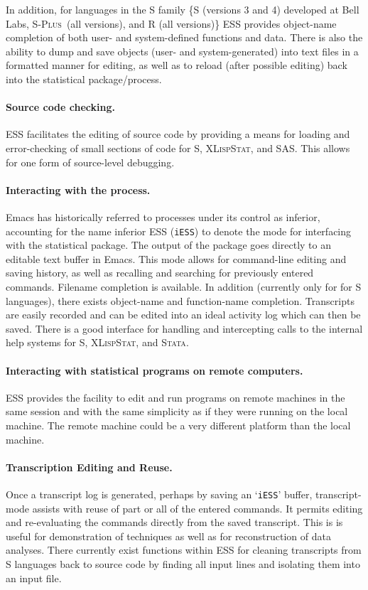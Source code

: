 \documentclass{article}
\newcommand*{\Splus}{\textsc{S-Plus}}
\newcommand*{\XLispStat}{\textsc{XLispStat}}
\newcommand*{\Stata}{\textsc{Stata}}
\newcommand{\stexttt}[1]{{\small\texttt{#1}}}
\newcommand{\file}[1]{`\stexttt{#1}'}
\begin{document}
In addition, for languages in the S family \{S (versions 3 and 4)
developed at Bell Labs, \Splus\ (all versions), and R (all versions)\}
ESS provides object-name completion of both user- and system-defined
functions and data.  There is also the ability to dump and save
objects (user- and system-generated) into text files in a formatted
manner for editing, as well as to reload (after possible editing) back
into the statistical package/process.

\paragraph{Source code checking.}
ESS facilitates the editing of source code by providing a means
for loading and error-checking of small sections of code for S,
\XLispStat, and SAS.  This allows for one form of source-level
debugging.

\paragraph{Interacting with the process.}
Emacs has historically referred to processes under its control as
inferior, accounting for the name inferior ESS (\stexttt{iESS}) to
denote the mode for interfacing with the statistical package.  The
output of the package goes directly to an editable text buffer in
Emacs.  This mode allows for command-line editing and saving history,
as well as recalling and searching for previously entered commands.
Filename completion is available.  In addition (currently only for for
S languages), there exists object-name and function-name completion.
Transcripts are easily recorded and can be edited into an ideal
activity log which can then be saved.  There is a good interface for
handling and intercepting calls to the internal help systems for S,
\XLispStat, and \Stata.

\paragraph{Interacting with statistical programs on remote computers.}
ESS provides the facility to edit and run programs on remote machines
in the same session and with the same simplicity as if they were
running on the local machine.  The remote machine could be a very
different platform than the local machine.

\paragraph{Transcription Editing and Reuse.}
Once a transcript log is generated, perhaps by saving an \file{iESS}
buffer, transcript-mode assists with reuse of part or all of the
entered commands.  It permits editing and re-evaluating the commands
directly from the saved transcript.  This is is useful for
demonstration of techniques as well as for reconstruction of data
analyses.  There currently exist functions within ESS for cleaning
transcripts from S languages back to source code by finding all input
lines and isolating them into an input file.
\end{document}
